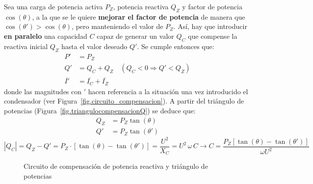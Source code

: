 Sea una carga de potencia activa $P_Z$, potencia reactiva $Q_Z$ y
factor de potencia $\cos(\theta)$, a la que se le quiere
\textbf{mejorar el factor de potencia} de manera que
$\cos (\theta') > \cos (\theta)$, pero manteniendo el valor de
$P_Z$. Así, hay que introducir \textbf{en paralelo} una capacidad $C$
capaz de generar un valor $Q_C$ que compense la reactiva inicial $Q_Z$
hasta el valor deseado $Q'$. Se cumple entonces que:
\begin{align*}
  P' &= P_Z\\
  Q' &= Q_C + Q_Z \quad (Q_C<0\Rightarrow Q' < Q_Z)\\
  \overline{I'} &= \overline{I_C} + \overline{I_Z}
\end{align*}
donde las magnitudes con $'$ hacen referencia a la situación una vez
introducido el condensador (ver
Figura~\ref{fig.circuito_compensacion}). A partir del triángulo de
potencias (Figura~\ref{fig.triangulocompensacionQ}) se deduce que:
\begin{align*}
  Q_Z &= P_Z \tan (\theta)\\
  Q'&= P_Z \tan (\theta')
\end{align*}
\begin{equation}\label{eq.compensacion_Q_mono}
  |Q_C| = Q_Z - Q' = P_Z\cdot \left[\tan (\theta) - \tan (\theta')\right]=\dfrac{U^2}{X_C}={U^2\,\omega\,C}\rightarrow \boxed{C=\frac{P_Z \left[\tan (\theta) - \tan (\theta')\right]}{\omega U^2}}
\end{equation}
	
	
\begin{figure}
  \centering
  \hfil {}
  \caption{Circuito de compensación de potencia reactiva y triángulo
    de potencias}
  \label{fig.circuitocompensacionreactiva}
\end{figure}
	

